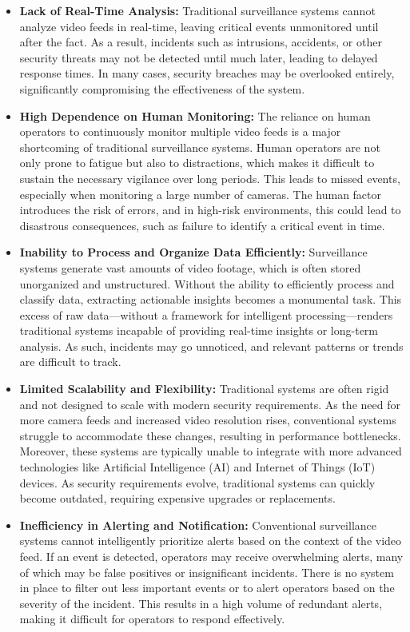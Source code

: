 \documentclass[12pt]{report}
\begin{document}
\begin{itemize}
    \item \textbf{Lack of Real-Time Analysis:} 
    Traditional surveillance systems cannot analyze video feeds in real-time, leaving critical events unmonitored until after the fact. As a result, incidents such as intrusions, accidents, or other security threats may not be detected until much later, leading to delayed response times. In many cases, security breaches may be overlooked entirely, significantly compromising the effectiveness of the system.
    
    \item \textbf{High Dependence on Human Monitoring:} 
    The reliance on human operators to continuously monitor multiple video feeds is a major shortcoming of traditional surveillance systems. Human operators are not only prone to fatigue but also to distractions, which makes it difficult to sustain the necessary vigilance over long periods. This leads to missed events, especially when monitoring a large number of cameras. The human factor introduces the risk of errors, and in high-risk environments, this could lead to disastrous consequences, such as failure to identify a critical event in time.
    
    \item \textbf{Inability to Process and Organize Data Efficiently:} 
    Surveillance systems generate vast amounts of video footage, which is often stored unorganized and unstructured. Without the ability to efficiently process and classify data, extracting actionable insights becomes a monumental task. This excess of raw data—without a framework for intelligent processing—renders traditional systems incapable of providing real-time insights or long-term analysis. As such, incidents may go unnoticed, and relevant patterns or trends are difficult to track.
    
    \item \textbf{Limited Scalability and Flexibility:} 
    Traditional systems are often rigid and not designed to scale with modern security requirements. As the need for more camera feeds and increased video resolution rises, conventional systems struggle to accommodate these changes, resulting in performance bottlenecks. Moreover, these systems are typically unable to integrate with more advanced technologies like Artificial Intelligence (AI) and Internet of Things (IoT) devices. As security requirements evolve, traditional systems can quickly become outdated, requiring expensive upgrades or replacements.
    
    \item \textbf{Inefficiency in Alerting and Notification:} 
    Conventional surveillance systems cannot intelligently prioritize alerts based on the context of the video feed. If an event is detected, operators may receive overwhelming alerts, many of which may be false positives or insignificant incidents. There is no system in place to filter out less important events or to alert operators based on the severity of the incident. This results in a high volume of redundant alerts, making it difficult for operators to respond effectively.
\end{itemize}
\end{document}
